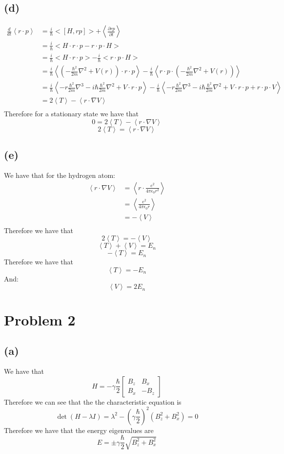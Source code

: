 \documentclass[11pt]{article}
\begin{document}
\subsection*{(d)}
\begin{align*}
    \frac{d}{dt}\left<r\cdot p\right> &= \frac{i}{\hbar}<[H,rp]>+\left<\frac{\partial rp}{\partial t}\right>\\
    &= \frac{i}{\hbar}<H\cdot r \cdot p-r\cdot p \cdot H>\\
    &= \frac{i}{\hbar}<H\cdot r \cdot p>-\frac{i}{\hbar}<r \cdot p \cdot H>\\
    &= \frac{i}{\hbar}\left<\left(-\frac{\hbar^2}{2m}\nabla^2+V(r)\right)\cdot r\cdot p\right>-\frac{i}{\hbar}\left<r\cdot p\cdot\left(-\frac{\hbar^2}{2m}\nabla^2+V(r)\right)\right>\\
    &= \frac{i}{\hbar}\left<-r\frac{\hbar^2}{2m}\nabla^3-i\hbar\frac{\hbar^2}{2m}\nabla^2+V\cdot r\cdot p\right> - \frac{i}{\hbar}\left<-r\frac{\hbar^2}{2m}\nabla^3-i\hbar\frac{\hbar^2}{2m}\nabla^2+V\cdot r\cdot p+ r\cdot p \cdot V\right>\\
    &= 2\left<T\right>-\left<r\cdot \nabla V\right>\\
\end{align*}
Therefore for a stationary state we have that
$$0 = 2\left<T\right>-\left<r\cdot \nabla V\right>$$
$$2\left<T\right> = \left<r\cdot \nabla V\right>$$
\subsection*{(e)}
We have that for the hydrogen atom:
\begin{align*}
    \left<r\cdot \nabla V\right> &= \left<r\cdot \frac{e^2}{4\pi\epsilon_0r^2}\right>\\
    &= \left<\frac{e^2}{4\pi\epsilon_0r}\right>\\
    &= -\left<V\right>\\
\end{align*}
Therefore we have that
$$2\left<T\right> = -\left<V\right>$$
$$\left<T\right> + \left<V\right> = E_n$$
$$-\left<T\right> = E_n$$
Therefore we have that
$$\left<T\right> = -E_n$$
And:
$$\left<V\right> = 2E_n$$



\section*{Problem 2}
\subsection*{(a)}
We have that 
$$H = -\gamma\frac{\hbar}{2} \begin{bmatrix}
    B_z & B_x\\
    B_x & -B_z
\end{bmatrix}$$
Therefore we can see that the the characteristic equation is
$$\det(H - \lambda I) = \lambda^2 -\left(\gamma\frac{\hbar}{2}\right)^2(B_z^2+B_x^2) = 0$$
Therefore we have that the energy eigenvalues are
$$E = \pm \gamma\frac{\hbar}{2}\sqrt{B_z^2+B_x^2}$$
\end{document}
